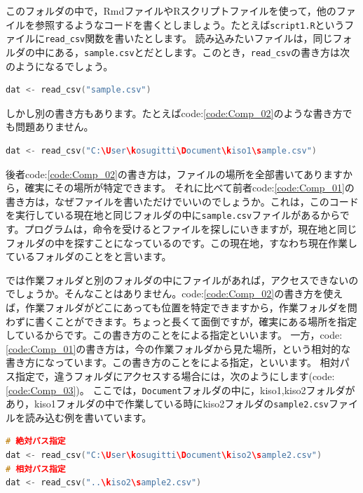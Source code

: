 \documentclass{ltjsbook}
\begin{document}
このフォルダの中で，RmdファイルやRスクリプトファイルを使って，他のファイルを参照するようなコードを書くとしましょう。たとえば\verb|script1.R|というファイルに\verb|read_csv|関数を書いたとします。
読み込みたいファイルは，同じフォルダの中にある，\verb|sample.csv|とだとします。このとき，\verb|read_csv|の書き方は次のようになるでしょう。

\begin{lstlisting}[language=c++,label={code:Comp_01},caption={相対パスで読み込む}]
dat <- read_csv("sample.csv")
\end{lstlisting}

しかし別の書き方もあります。たとえばcode:\ref{code:Comp_02}のような書き方でも問題ありません。
\begin{lstlisting}[language=c++,label={code:Comp_02},caption={絶対パスで読み込む}]
dat <- read_csv("C:\User\kosugitti\Document\kiso1\sample.csv")
\end{lstlisting}

後者code:\ref{code:Comp_02}の書き方は，ファイルの場所を全部書いてありますから，確実にその場所が特定できます。
それに比べて前者code:\ref{code:Comp_01}の書き方は，なぜファイルを書いただけでいいのでしょうか。これは，このコードを実行している現在地と同じフォルダの中に\verb|sample.csv|ファイルがあるからです。プログラムは，命令を受けるとファイルを探しにいきますが，現在地と同じフォルダの中を探すことになっているのです。この現在地，すなわち現在作業しているフォルダのことをと言います。

では作業フォルダと別のフォルダの中にファイルがあれば，アクセスできないのでしょうか。そんなことはありません。code:\ref{code:Comp_02}の書き方を使えば，作業フォルダがどこにあっても位置を特定できますから，作業フォルダを問わずに書くことができます。ちょっと長くて面倒ですが，確実にある場所を指定しているからです。この書き方のことをによる指定といいます。
一方，code:\ref{code:Comp_01}の書き方は，今の作業フォルダから見た場所，という相対的な書き方になっています。この書き方のことをによる指定，といいます。
相対パス指定で，違うフォルダにアクセスする場合には，次のようにします(code:\ref{code:Comp_03})。
ここでは，\verb|Document|フォルダの中に，kiso1,kiso2フォルダがあり，kiso1フォルダの中で作業している時にkiso2フォルダの\verb|sample2.csv|ファイルを読み込む例を書いています。

\begin{lstlisting}[language=c++,label={code:Comp_03},caption={絶対パスで読み込む}]
# 絶対パス指定
dat <- read_csv("C:\User\kosugitti\Document\kiso2\sample2.csv")
# 相対パス指定
dat <- read_csv("..\kiso2\sample2.csv")
\end{lstlisting}
\end{document}
